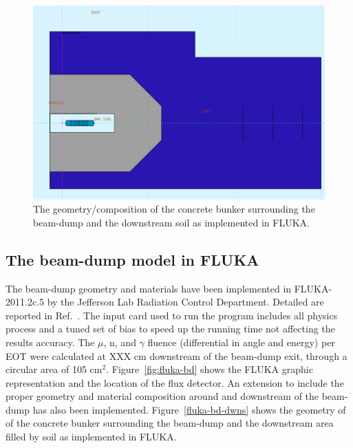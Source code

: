 \begin{figure}[h!] 
\center
\includegraphics[width=12.5cm]{figs/fluka-bd-dwns.pdf}
\caption{The geometry/composition  of the concrete bunker surrounding the beam-dump and  the downstream soil as implemented in FLUKA.}
\label{fig:fluka-bd-dwns}
\end{figure}
\subsection{The beam-dump model in FLUKA}
The beam-dump geometry and  materials have  been implemented in FLUKA-2011.2c.5 by the Jefferson Lab Radiation Control Department. Detailed are reported in Ref.~\cite{jnote-bd}.  The input card used to run the program  includes all physics process and a tuned set of bias to speed up the running time not affecting the  results accuracy. 
The $\mu$, n, and $\gamma$ fluence (differential in angle and energy) per EOT were  calculated   at XXX cm  downstream of the beam-dump exit, through a circular area of 105 cm$^2$. Figure~\ref{fig:fluka-bd} shows the FLUKA graphic representation and the location of the flux detector.
An extension to include the proper geometry and material composition around and downstream of the beam-dump has also been implemented.
Figure~\ref{fluka-bd-dwns}  shows the geometry of of the concrete bunker surrounding the beam-dump and  the downstream area filled by soil as implemented in FLUKA.




